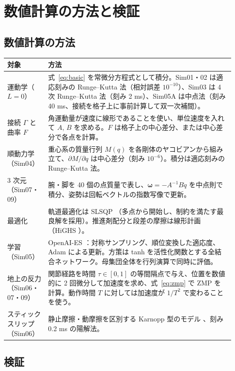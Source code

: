 \chapter{数値計算の方法と検証}\label{app:num}

\section{数値計算の方法}

\begin{longtable}{p{0.16\linewidth}p{0.77\linewidth}}
\toprule
対象 & 方法 \\ \midrule \endhead
運動学（$L=0$） & 式~\eqref{eq:basic} を常微分方程式として積分。Sim01・02 は適応刻みの Runge--Kutta 法（相対誤差 $10^{-10}$）、Sim03 は 4 次 Runge--Kutta 法（刻み 2 ms）、Sim05A は中点法（刻み 40 ms、接続を格子上に事前計算して双一次補間）。 \\
接続 $\Gamma$ と曲率 $F$ & 角運動量が速度に線形であることを使い、単位速度を入れて $A$, $B$ を求める。$F$ は格子上の中心差分、または中心差分で各点を計算。 \\
順動力学（Sim04） & 重心系の質量行列 $M(q)$ を各剛体のヤコビアンから組み立て、$\partial M/\partial q$ は中心差分（刻み $10^{-6}$）。積分は適応刻みの Runge--Kutta 法。 \\
3 次元（Sim07・09） & 腕・脚を 40 個の点質量で表し、$\bm\omega=-A^{-1}B\dot q$ を中点則で積分、姿勢は回転ベクトルの指数写像で更新。 \\
最適化 & 軌道最適化は SLSQP \cite{R26}（多点から開始し、制約を満たす最良解を採用）。推進剤配分と段差の摩擦は線形計画（HiGHS \cite{R25}）。 \\
学習（Sim05） & OpenAI-ES \cite{R19}：対称サンプリング、順位変換した適応度、Adam \cite{R20} による更新。方策は tanh を活性化関数とする全結合ネットワーク。母集団全体を行列演算で同時に評価。 \\
地上の反力（Sim06・07・09） & 関節経路を時間 $\tau\in[0,1]$ の等間隔点で与え、位置を数値的に 2 回微分して加速度を求め、式~\eqref{eq:zmp} で ZMP を計算。動作時間 $T$ に対しては加速度が $1/T^2$ で変わることを使う。 \\
スティックスリップ（Sim06） & 静止摩擦・動摩擦を区別する Karnopp 型のモデル \cite{R30}、刻み 0.2 ms の陽解法。 \\
\bottomrule
\end{longtable}

\section{検証}

